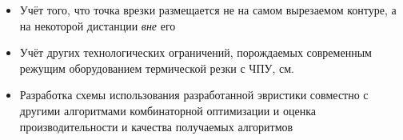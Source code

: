 \documentclass[14pt]{extarticle}
\theoremstyle{plain}%
\theoremstyle{remark}
\begin{document}
\begin{itemize}
  \item
  Учёт того,
  что точка врезки размещается не на самом
  вырезаемом контуре,
  а на некоторой дистанции
  \textit{вне} его
  \item
  Учёт других технологических ограничений,
  порождаемых современным режущим оборудованием
  термической резки с ЧПУ,
  см. \cite{Sozopol}
  \item
  Разработка схемы использования разработанной эвристики
  совместно с другими алгоритмами комбинаторной оптимизации
  и оценка производительности и качества получаемых
  алгоритмов
\end{itemize}

\printbibliography[heading=bibintoc]
\nocite{*}
\end{document}
